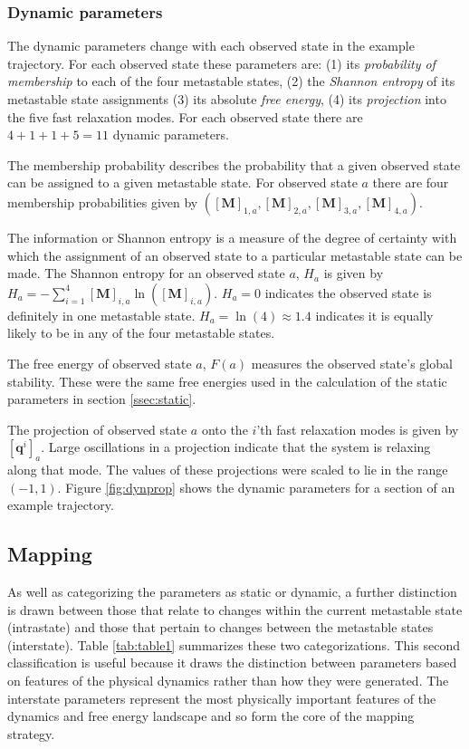 \documentclass[a4paper,10pt,oneside]{article}
\begin{document}
\begin{sloppy}
\subsubsection{Dynamic parameters}
The dynamic parameters change with each observed state in the example trajectory. For each observed state these parameters are: (1) its \emph{probability of membership} to each of the four metastable states, (2)  the \emph{Shannon entropy} of its metastable state assignments (3) its absolute \emph{free energy}, (4) its \emph{projection} into the five fast relaxation modes. For each observed state there are $4+1+1+5 = 11$ dynamic parameters.  

The membership probability describes the probability that a given observed state can be assigned to a given metastable state.  For observed state $a$ there are four membership probabilities given by $([\mathbf{M}]_{1,a}, [\mathbf{M}]_{2,a},[\mathbf{M}]_{3,a},[\mathbf{M}]_{4,a} )$.  

The information or Shannon entropy is a measure of the degree of certainty with which the assignment of an observed state to a particular metastable state can be made.  The Shannon entropy for an observed state $a$, $H_{a}$ is given by $
H_{a} = -\sum^{4}_{i=1} [\mathbf{M}]_{i,a} \ln([\mathbf{M}]_{i,a})$. 
$H_{a} = 0$ indicates the observed state is definitely in one metastable state.  $H_{a} = \ln(4) \approx 1.4$ indicates it is equally likely to be in any of the four metastable states.  

The free energy of observed state $a$, $F(a)$ measures the observed state's global stability. These were the same free energies used in the calculation of the static parameters in section \ref{ssec:static}. 

The projection of observed state $a$ onto the $i$'th fast relaxation modes is given by $[\mathbf{q}^i]_{a}$. Large oscillations in a projection indicate that the system is relaxing along that mode.  The values of these projections were scaled to lie in the range $(-1,1)$. Figure \ref{fig:dynprop} shows the dynamic parameters for a section of an example trajectory. 

\subsection{Mapping} \label{ssec:map}

As well as categorizing the parameters as static or dynamic, a further distinction is drawn between those that relate to changes within the current metastable state (intrastate) and those that pertain to changes between the metastable states (interstate). Table \ref{tab:table1} summarizes these two categorizations.  This second classification is useful because it draws the distinction between parameters based on features of the physical dynamics rather than how they were generated. The interstate parameters represent the most physically important features of the dynamics and free energy landscape and so form the core of the mapping strategy.  


\end{sloppy}
\end{document}
